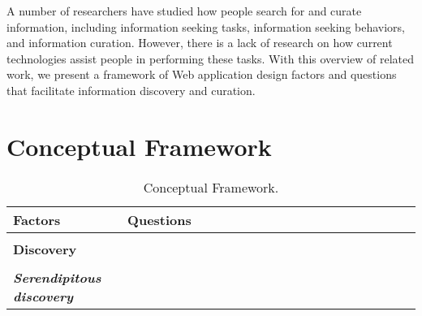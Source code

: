 \documentclass{casconpaper}
\begin{document}
{A number of researchers have studied how people search for and curate information, including information seeking tasks, information seeking behaviors, and information curation. However, there is a lack of research on how current technologies assist people in performing these tasks. With this overview of related work, we present a framework of Web application design factors and questions that facilitate information discovery and curation.
} %




{\section{Conceptual Framework}
\begin{table*}[htbp]
\caption{Conceptual Framework.}
\centering
\small
\begin{tabular}{|p{0.28\linewidth}|p{0.72\linewidth}|}
\hline
\textbf{\large{Factors}}   & \textbf{\large{Questions}}  \\
\hline
&\\
\textbf{\large{Discovery}}                     &                                                                                                           \\

&\\
\emph{\textbf{Serendipitous discovery}}     &                                                                                                           \\


\end{tabular}
\end{table*}}
\end{document}

